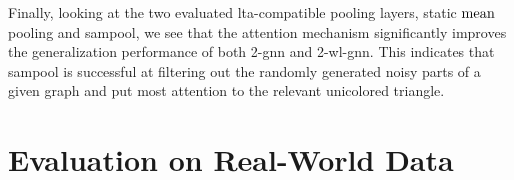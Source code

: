 Finally, looking at the two evaluated \acs{lta}-compatible pooling layers, static $\operatorname{mean}$ pooling and \ac{sampool}, we see that the attention mechanism significantly improves the generalization performance of both 2-\acs{gnn} and 2-\acs{wl}-\acs{gnn}.
This indicates that \ac{sampool} is successful at filtering out the randomly generated noisy parts of a given graph and put most attention to the relevant unicolored triangle.

\section{Evaluation on Real-World Data}%
\label{sec:eval:real}
